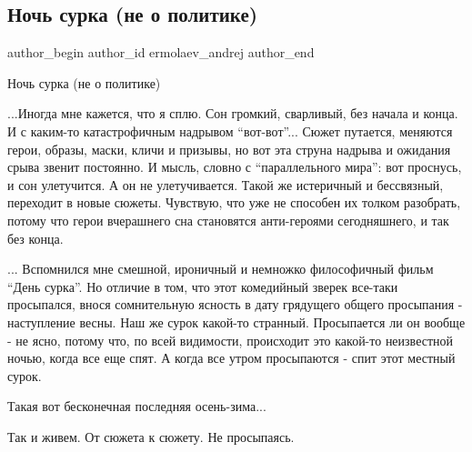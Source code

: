  
 
 
 
 
 
\subsection{Ночь сурка (не о политике)}
\label{sec:18_01_2022.fb.ermolaev_andrej.1.noch_surka}
 
\ifcmt
 author_begin
   author_id ermolaev_andrej
 author_end
\fi

Ночь сурка (не о политике)

...Иногда мне кажется, что я сплю. Сон громкий, сварливый, без начала и конца.
И с каким-то катастрофичным надрывом \enquote{вот-вот}... Сюжет путается, меняются
герои, образы, маски, кличи и призывы, но вот эта струна надрыва и ожидания
срыва звенит постоянно. И мысль, словно с \enquote{параллельного мира}: вот проснусь, и
сон улетучится. А он не улетучивается. Такой же истеричный и бессвязный,
переходит в новые сюжеты. Чувствую, что уже не способен их толком разобрать,
потому что герои вчерашнего сна становятся анти-героями сегодняшнего, и так без
конца. 

... Вспомнился мне смешной, ироничный и немножко философичный фильм \enquote{День
сурка}. Но отличие в том, что этот комедийный зверек все-таки просыпался, внося
сомнительную ясность в дату грядущего общего просыпания - наступление весны.
Наш же сурок какой-то странный. Просыпается ли он вообще - не ясно, потому что,
по всей видимости, происходит это какой-то неизвестной ночью, когда все еще
спят. А когда все утром просыпаются - спит этот местный сурок. 

Такая вот бесконечная последняя осень-зима...

Так и живем. От сюжета к сюжету. Не просыпаясь.

